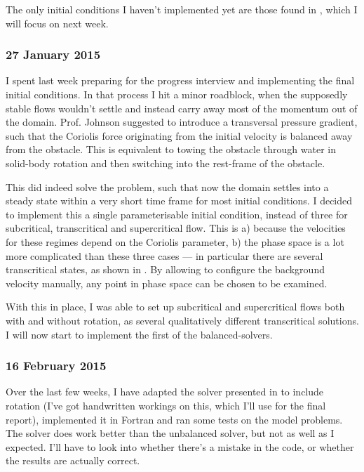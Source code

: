 \documentclass[a4paper,onecolumn,11pt]{report}
\begin{document}
The only initial conditions I haven't implemented yet are those found in \citet{esler2005steady}, which I will focus on next week.

\subsubsection*{27 January 2015}

I spent last week preparing for the progress interview and implementing the final initial conditions. In that process I hit a minor roadblock, when the supposedly stable flows wouldn't settle and instead carry away most of the momentum out of the domain. Prof. Johnson suggested to introduce a transversal pressure gradient, such that the Coriolis force originating from the initial velocity is balanced away from the obstacle. This is equivalent to towing the obstacle through water in solid-body rotation and then switching into the rest-frame of the obstacle.

This did indeed solve the problem, such that now the domain settles into a steady state within a very short time frame for most initial conditions. I decided to implement this a single parameterisable initial condition, instead of three for subcritical, transcritical and supercritical flow. This is a) because the velocities for these regimes depend on the Coriolis parameter, b) the phase space is a lot more complicated than these three cases --- in particular there are several transcritical states, as shown in \citet{esler2005steady}. By allowing to configure the background velocity manually, any point in phase space can be chosen to be examined.

With this in place, I was able to set up subcritical and supercritical flows both with and without rotation, as several qualitatively different transcritical solutions. I will now start to implement the first of the balanced-solvers.

\subsubsection*{16 February 2015}

Over the last few weeks, I have adapted the solver presented in \citet{leveque1998balancing} to include rotation (I've got handwritten workings on this, which I'll use for the final report), implemented it in Fortran and ran some tests on the model problems. The solver does work better than the unbalanced solver, but not as well as I expected. I'll have to look into whether there's a mistake in the code, or whether the results are actually correct.
\end{document}
